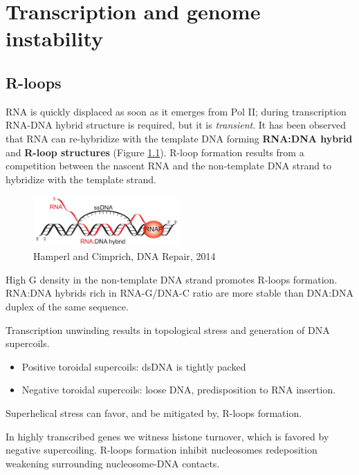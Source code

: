 \graphicspath{{chapters/_resources/}}

\chapter{Transcription and genome instability}


\hypertarget{r-loops}{%
\section{R-loops}\label{r-loops}}

RNA is quickly displaced as soon as it emerges from Pol II; during transcription RNA-DNA hybrid structure is required, but it is \emph{transient}. It has been observed that RNA can re-hybridize with the template DNA forming \textbf{RNA:DNA hybrid} and \textbf{R-loop structures} (Figure \ref{fig:hybrid}). R-loop formation results from a competition between the nascent RNA and the non-template DNA strand to hybridize with the template strand.

\begin{figure}
\centering
\includegraphics[width=0.5\textwidth]{../_resources/Screen_Shot_2022-11-23_at_09-53-33.png}
\caption{Hamperl and Cimprich, DNA Repair, 2014}
\label{fig:hybrid}
\end{figure}

High G density in the non-template DNA strand promotes R-loops formation. RNA:DNA hybrids rich in RNA-G/DNA-C ratio are more stable than DNA:DNA duplex of the same sequence.

Transcription unwinding results in topological stress and generation of DNA supercoils.
\begin{itemize}
\tightlist
\item
  Positive toroidal supercoils: dsDNA is tightly packed
\item
  Negative toroidal supercoils: loose DNA, predisposition to RNA insertion.
\end{itemize}

Superhelical stress can favor, and be mitigated by, R-loops formation.

In highly transcribed genes we witness histone turnover, which is favored by negative supercoiling. R-loops formation inhibit nucleosomes redeposition weakening surrounding nucleosome-DNA contacts.

